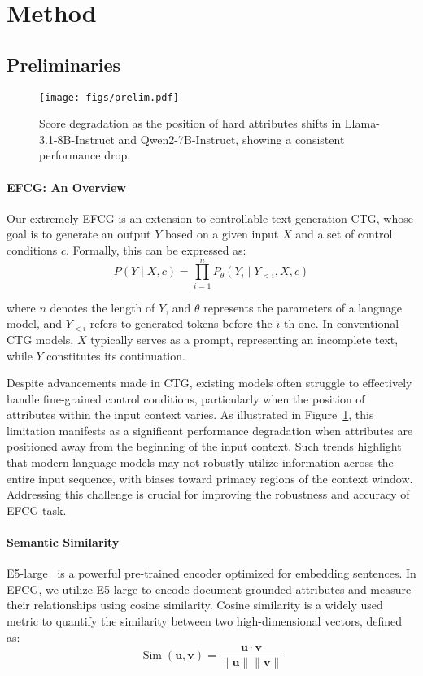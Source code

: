 \section{Method}
\subsection{Preliminaries}

\begin{figure}[t]
    \centering
        \texttt{[image: figs/prelim.pdf]}
    \caption{Score degradation as the position of hard attributes shifts in Llama-3.1-8B-Instruct and Qwen2-7B-Instruct, showing a consistent performance drop.}
    \vspace{-0.5em}
    \label{fig:position_bias}
\end{figure}

\paragraph{EFCG: An Overview}
Our extremely EFCG is an extension to controllable text generation CTG, whose goal is to generate an output $Y$ based on a given input $X$ and a set of control conditions $c$. Formally, this can be expressed as:
$$
P(Y \mid X, c)=\prod_{i=1}^n P_\theta\left(Y_i \mid Y_{<i}, X, c\right)
$$

\noindent where $n$ denotes the length of $Y$, and $\theta$ represents the parameters of a language model, and $Y_{<i}$ refers to generated tokens before the $i$-th one. 
In conventional CTG models, $X$ typically serves as a prompt, representing an incomplete text, while $Y$ constitutes its continuation.

Despite advancements made in CTG, existing models often struggle to effectively handle fine-grained control conditions, particularly when the position of attributes within the input context varies. As illustrated in Figure~\ref{fig:position_bias}, this limitation manifests as a significant performance degradation when attributes are positioned away from the beginning of the input context. Such trends highlight that modern language models may not robustly utilize information across the entire input sequence, with biases toward primacy regions of the context window. Addressing this challenge is crucial for improving the robustness and accuracy of EFCG task.

\vspace{-0.5em}
\paragraph{Semantic Similarity}
E5-large~\cite{wang2022text} is a powerful pre-trained encoder optimized for embedding sentences.
In EFCG, we utilize E5-large to encode document-grounded attributes and measure their relationships using cosine similarity. Cosine similarity is a widely used metric to quantify the similarity between two high-dimensional vectors, defined as:
$$
\operatorname{Sim}(\mathbf{u}, \mathbf{v})=\frac{\mathbf{u} \cdot \mathbf{v}}{\|\mathbf{u}\|\|\mathbf{v}\|}
$$

